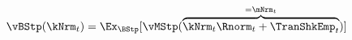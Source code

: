  \begin{equation}\begin{gathered}\begin{aligned}
\vBStp(\kNrm_{t}) & = \Ex_{\BStp}[\vMStp(\overbrace{\kNrm_{t} \Rnorm_{t} + \TranShkEmp_{t}}^{=\mNrm_{t}})]  \label{eq:vBStp}
      \end{aligned}\end{gathered}\end{equation}
